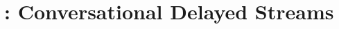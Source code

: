 \DeclareRobustCommand{\mdltok}[1]{\ensuremath{\langle\mathrm{#1}\rangle}}

\section{\model: Conversational Delayed Streams}\label{sec:model}


